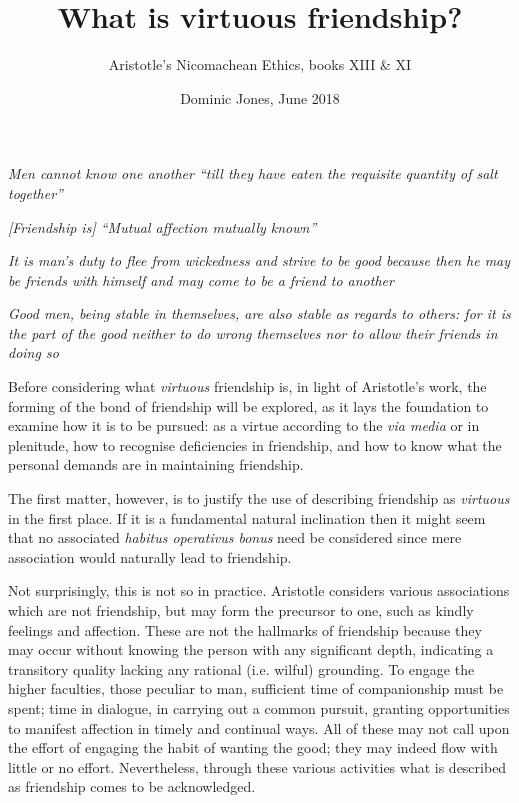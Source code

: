 \documentclass[a4paper,10pt]{article}
\title{What is virtuous friendship?}
\author{Aristotle's Nicomachean Ethics, books XIII \& XI}
\date{Dominic Jones, June 2018}
\begin{document}
\maketitle



\epigraph{\textit{Men cannot know one another ``till they have eaten the requisite quantity of salt together''}}{}
\vspace{-8mm}
\epigraph{\textit{[Friendship is] ``Mutual affection mutually known''}}{}
\vspace{-8mm}
\epigraph{\textit{It is man's duty to flee from wickedness and strive to be good because then he may be friends with himself and may come to be a friend to another}}{}
\vspace{-8mm}
\epigraph{\textit{Good men, being stable in themselves, are also stable as regards to others: for it is the part of the good neither to do wrong themselves nor to allow their friends in doing so}}{}


Before considering what \emph{virtuous} friendship is, in light of Aristotle's work, the forming of the bond of friendship will be explored, as it lays the foundation to examine how it is to be pursued: as a virtue according to the \emph{via media} or in plenitude, how to recognise deficiencies in friendship, and how to know what the personal demands are in maintaining friendship.

The first matter, however, is to justify the use of describing friendship as \emph{virtuous} in the first place. If it is a fundamental natural inclination then it might seem that no associated \emph{habitus operativus bonus} need be considered since mere association would naturally lead to friendship.

Not surprisingly, this is not so in practice. Aristotle considers various associations which are not friendship, but may form the precursor to one, such as kindly feelings and affection. These are not the hallmarks of friendship because they may occur without knowing the person with any significant depth, indicating a transitory quality lacking any rational (i.e. wilful) grounding. To engage the higher faculties, those peculiar to man, sufficient time of companionship must be spent; time in dialogue, in carrying out a common pursuit, granting opportunities to manifest affection in timely and continual ways. All of these may not call upon the effort of engaging the habit of wanting the good; they may indeed flow with little or no effort. Nevertheless, through these various activities what is described as friendship comes to be acknowledged.
\end{document}
